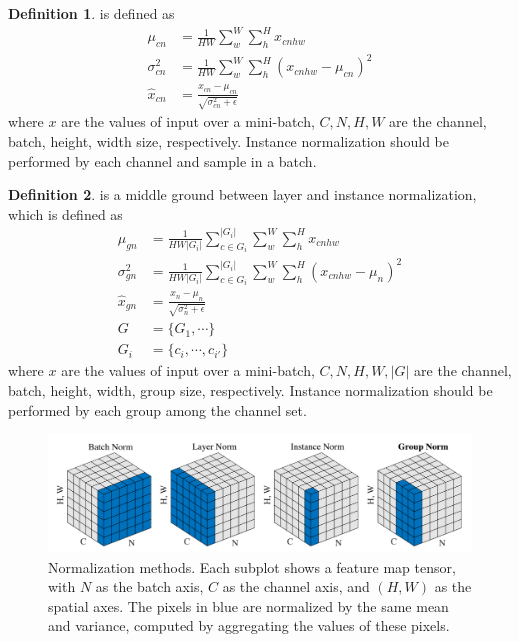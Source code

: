 \documentclass[a4paper]{article}
\theoremstyle{definition}
\newtheorem{definition}{Definition}
\theoremstyle{plain}
\begin{document}
\begin{definition}
 is defined as
\begin{align*}
     \mu_{cn}&=\frac{1}{HW}\sum^W_w\sum^H_h x_{cnhw}\\
     \sigma_{cn}^2&=\frac{1}{HW}\sum^W_w\sum^H_h(x_{cnhw}-\mu_{cn})^2\\
     \hat{x}_{cn}&=\frac{x_{cn}-\mu_{cn}}{\sqrt{\sigma_{cn}^2+\epsilon}}
\end{align*}
where $x$ are the values of input over a mini-batch, $C,N,H,W$ are the channel, batch, height, width size, respectively. Instance normalization should be performed by each channel and sample in a batch.
\end{definition}

\begin{definition}
\cite{group} is a middle ground between layer and instance normalization, which is defined as
\begin{align*}
     \mu_{gn}&=\frac{1}{HW|G_i|}\sum^{|G_i|}_{c\in G_i}\sum^W_w\sum^H_h x_{cnhw}\\
     \sigma_{gn}^2&=\frac{1}{HW|G_i|}\sum^{|G_i|}_{c\in G_i}\sum^W_w\sum^H_h(x_{cnhw}-\mu_n)^2\\
     \hat{x}_{gn}&=\frac{x_{n}-\mu_{n}}{\sqrt{\sigma_{n}^2+\epsilon}}\\
     G&=\{G_1,\cdots\}\\
     G_i&=\{c_i,\cdots,c_{i'}\}
\end{align*}
where $x$ are the values of input over a mini-batch, $C,N,H,W,|G|$ are the channel, batch, height, width, group size, respectively. Instance normalization should be performed by each group among the channel set.
\end{definition}

\begin{figure}[H]
    \centering
    \includegraphics[scale=0.4]{figure/normalization.png}
    \caption{Normalization methods. Each subplot shows a feature map tensor, with $N$ as the batch axis, $C$ as the channel axis, and $(H, W)$ as the spatial axes. The pixels in blue are normalized by the same mean and variance, computed by aggregating the values of these pixels.}
    \label{fig:my_label}
\end{figure}
\end{document}
